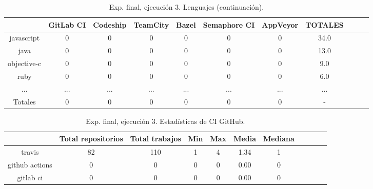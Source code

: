 \begin{table}[h]
  \centering
  \caption{Exp. final, ejecución 3. Lenguajes (continuación).}
  \label{tab:tabla_f3_2b}

\begin{footnotesize}
\renewcommand{\arraystretch}{1.5} %
\begin{tabular}{ccccccccccc}
  \hline
  {} &  GitLab CI &  Codeship &  TeamCity &  Bazel &  Semaphore CI &  AppVeyor &  TOTALES \\
  \hline
  javascript   &        0 &         0 &         0 &      0 &             0 &         0 &     34.0 \\
  java         &        0 &         0 &         0 &      0 &             0 &         0 &     13.0 \\
  objective-c  &        0 &         0 &         0 &      0 &             0 &         0 &      9.0 \\
  ruby         &        0 &         0 &         0 &      0 &             0 &         0 &      6.0 \\
  ...          &      ... &       ... &       ... &    ... &           ... &        ...&      ... \\
  \hline
  Totales      &        0 &         0 &         0 &      0 &             0 &         0 &        - \\
 \end{tabular}
\end{footnotesize}

\end{table}

\begin{table}
  \centering
  \caption{Exp. final, ejecución 3. Estadísticas de CI GitHub.}
  \label{tab:tabla_f3_3}

\begin{footnotesize}
\renewcommand{\arraystretch}{1.5} %
\begin{tabular}{ccccccccccc}
  \hline
  {} &  Total repositorios &  Total trabajos &  Min &  Max &  Media &  Mediana \\
  \hline
  travis         &         82 &         110 &    1 &    4 &   1.34 &        1 \\
  github actions &          0 &           0 &    0 &    0 &   0.00 &        0 \\
  gitlab ci      &          0 &           0 &    0 &    0 &   0.00 &        0 \\
 \end{tabular}
\end{footnotesize}

\end{table}

